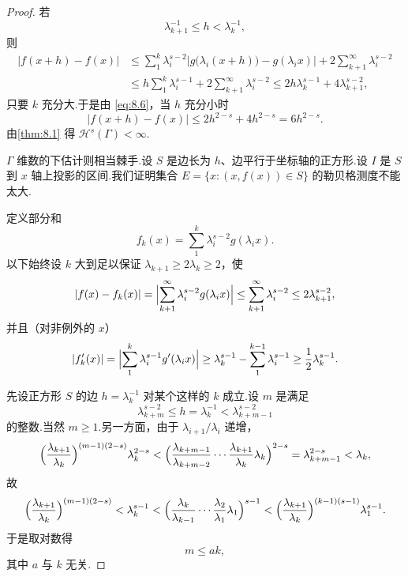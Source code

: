 \begin{proof}
若
\begin{equation}\label{eq:8.6}
  \lambda_{k+1}^{-1}\leq h<\lambda_k^{-1},
\end{equation}
则
\begin{align*}
  |f(x+h)-f(x)|
  &\leq\sum_{1}^{k}\lambda_i^{s-2}|g\bigl(\lambda_i(x+h)\bigr)-g(\lambda_i x)|+2\sum_{k+1}^{\infty}\lambda_i^{s-2}\\
  &\leq h\sum_{1}^{k}\lambda_i^{s-1}+2\sum_{k+1}^{\infty}\lambda_i^{s-2}
  \leq 2h\lambda_k^{s-1}+4\lambda_{k+1}^{s-2},
\end{align*}
只要 $k$ 充分大.于是由 \eqref{eq:8.6}，当 $h$ 充分小时
\[
  |f(x+h)-f(x)|\leq 2h^{2-s}+4h^{2-s}=6h^{2-s}.
\]
由\cref{thm:8.1} 得 $\mathcal{H}^s(\Gamma)<\infty$.

$\Gamma$ 维数的下估计则相当棘手.设 $S$ 是边长为 $h$、边平行于坐标轴的正方形.设 $I$ 是 $S$ 到 $x$ 轴上投影的区间.我们证明集合 $E=\{x:(x,f(x))\in S\}$ 的勒贝格测度不能太大.

定义部分和
\[
  f_k(x)=\sum_{1}^{k}\lambda_i^{s-2}g(\lambda_i x).
\]
以下始终设 $k$ 大到足以保证 $\lambda_{k+1}\geq 2\lambda_k\geq 2$，使
\begin{equation}\label{eq:8.7}
  |f(x)-f_k(x)|=\Bigl|\sum_{k+1}^{\infty}\lambda_i^{s-2}g(\lambda_i x)\Bigr|\leq\sum_{k+1}^{\infty}\lambda_i^{s-2}\leq 2\lambda_{k+1}^{s-2},
\end{equation}
并且（对非例外的 $x$）
\begin{equation}\label{eq:8.8}
  |f_k'(x)|=\Bigl|\sum_{1}^{k}\lambda_i^{s-1}g'(\lambda_i x)\Bigr|\geq\lambda_k^{s-1}-\sum_{1}^{k-1}\lambda_i^{s-1}\geq\frac{1}{2}\lambda_k^{s-1}.
\end{equation}

先设正方形 $S$ 的边 $h=\lambda_k^{-1}$ 对某个这样的 $k$ 成立.设 $m$ 是满足
\begin{equation}\label{eq:8.9}
  \lambda_{k+m}^{s-2}\leq h=\lambda_k^{-1}<\lambda_{k+m-1}^{s-2}
\end{equation}
的整数.当然 $m\geq 1$.另一方面，由于 $\lambda_{i+1}/\lambda_i$ 递增，
\[
  \Bigl(\frac{\lambda_{k+1}}{\lambda_k}\Bigr)^{(m-1)(2-s)}\lambda_k^{2-s}
  <\Bigl(\frac{\lambda_{k+m-1}}{\lambda_{k+m-2}}\cdots\frac{\lambda_{k+1}}{\lambda_k}\lambda_k\Bigr)^{2-s}
  =\lambda_{k+m-1}^{2-s}<\lambda_k,
\]
故
\[
  \Bigl(\frac{\lambda_{k+1}}{\lambda_k}\Bigr)^{(m-1)(2-s)}
  <\lambda_k^{s-1}
  <\Bigl(\frac{\lambda_k}{\lambda_{k-1}}\cdots\frac{\lambda_2}{\lambda_1}\lambda_1\Bigr)^{s-1}
  <\Bigl(\frac{\lambda_{k+1}}{\lambda_k}\Bigr)^{(k-1)(s-1)}\lambda_1^{s-1}.
\]
于是取对数得
\begin{equation}\label{eq:8.10}
  m\leq ak,
\end{equation}
其中 $a$ 与 $k$ 无关.


\end{proof}
